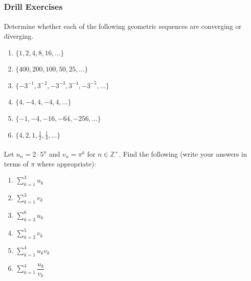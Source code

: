 \documentclass[12pt, a4paper, titlepage, twoside]{article}
\newcommand*{\Z}{\mathbb{Z}}
\begin{document}
	\hfill
	
	\subsubsection*{Drill Exercises}
	
	\paragraph{}
	 Determine whether each of the following geometric sequences are converging or diverging.
	
	\begin{multicols}{2}
		\begin{enumerate}[label=\textbf{(\alph*)}]
			\item $\{1, 2, 4, 8, 16,...\}$
			\item $\{400, 200, 100, 50, 25,...\}$
			\item $\{-3^{-1}, 3^{-2}, -3^{-3}, 3^{-4}, -3^{-5}, ...\}$
			\item $\{4, -4, 4, -4, 4,...\}$
			\item $\{-1, -4, -16, -64, -256,...\}$
			\item $\{4, 2, 1, \frac{1}{2}, \frac{1}{4}, ...\}$
		\end{enumerate}
	\end{multicols}
	
	\paragraph{}
	 Let $u_n = 2 \cdot 5^n$ and $v_n = \pi^k$ for $n \in \Z^+$. 
	Find the following (write your answers in terms of $\pi$ where appropriate):
	
	\begin{multicols}{2}
		\begin{enumerate}[label=\textbf{(\alph*)}]
			\item $\displaystyle \sum_{k=1}^3 u_k$
			\item $\displaystyle \sum_{k=1}^3 v_k$
			\item $\displaystyle \sum_{k=3}^6 u_k$
			\item $\displaystyle \sum_{k=2}^5 v_k$
			\item $\displaystyle \sum_{k=1}^{4} u_k v_k$
			\item $\displaystyle \sum_{k=1}^{4} \dfrac{u_k}{v_k}$
		\end{enumerate}
	\end{multicols}
	
\end{document}

